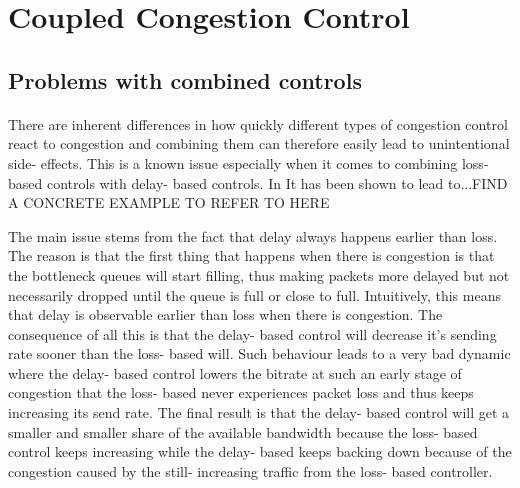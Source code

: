 \section{Coupled Congestion Control}
\subsection{Problems with combined controls}
\paragraph{}
There are inherent differences in how quickly different types of congestion control react to congestion and combining them can therefore easily lead to unintentional side- effects. 
This is a known issue especially when it comes to combining loss- based controls with delay- based controls.
In 
It has been shown to lead to...FIND A CONCRETE EXAMPLE TO REFER TO HERE 

The main issue stems from the fact that delay always happens earlier than loss.
The reason is that the first thing that happens when there is congestion is that the bottleneck queues will start filling, thus making packets more delayed but not necessarily dropped until the queue is full or close to full.
Intuitively, this means that delay is observable earlier than loss when there is congestion.
The consequence of all this is that the delay- based control will decrease it's sending rate sooner than the loss- based will. 
Such behaviour leads to a very bad dynamic where the delay- based control lowers the bitrate at such an early stage of congestion that the loss- based never experiences packet loss and thus keeps increasing its send rate. 
The final result is that the delay- based control will get a smaller and smaller share of the available bandwidth because the loss- based control keeps increasing while the delay- based keeps backing down because of the congestion caused by the still- increasing traffic from the loss- based controller.
